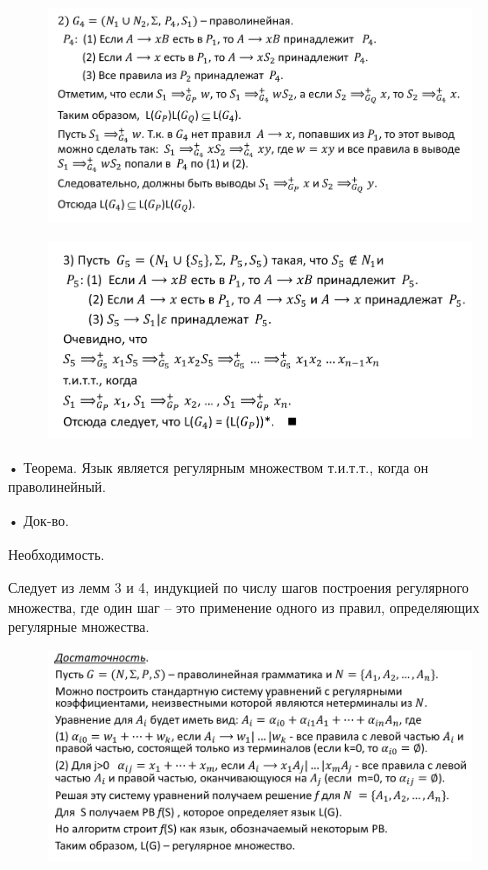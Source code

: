 \documentclass{article}
\begin{document}
\begin{figure}[H]
    \centering
    \includegraphics[width=1\linewidth]{Снимок экрана 2025-03-06 083127.png}
\end{figure}


\begin{figure}[H]
    \centering
    \includegraphics[width=1\linewidth]{Снимок экрана 2025-03-06 083156.png}
\end{figure}


• Теорема. Язык является регулярным множеством т.и.т.т., когда он
праволинейный.

• Док-во.

Необходимость.

Следует из лемм 3 и 4, индукцией по числу шагов построения регулярного
множества, где один шаг – это применение одного из правил, определяющих
регулярные множества.

\begin{figure}[H]
    \centering
    \includegraphics[width=1\linewidth]{Снимок экрана 2025-03-06 083319.png}
\end{figure}
\end{document}
